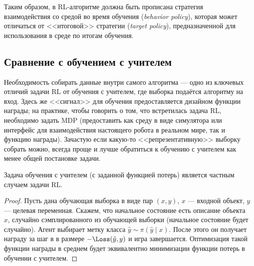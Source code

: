 Таким образом, в RL-алгоритме должна быть прописана стратегия взаимодействия со средой во время обучения (\emph{behavior policy}), которая может отличаться от <<итоговой>> стратегии (\emph{target policy}), предназначенной для использования в среде по итогам обучения. 


\subsection{Сравнение с обучением с учителем}

Необходимость собирать данные внутри самого алгоритма --- одно из ключевых отличий задачи RL от обучения с учителем, где выборка подаётся алгоритму на вход. Здесь же <<сигнал>> для обучения предоставляется дизайном функции награды; на практике, чтобы говорить о том, что встретилась задача RL, необходимо задать MDP (предоставить как среду в виде симулятора или интерфейс для взаимодействия настоящего робота в реальном мире, так и функцию награды). Зачастую если какую-то <<репрезентативную>> выборку собрать можно, всегда проще и лучше обратиться к обучению с учителем как менее общей постановке задачи.  

\begin{proposition}
Задача обучения с учителем (с заданной функцией потерь) является частным случаем задачи RL.
\begin{proof}
Пусть дана обучающая выборка в виде пар $(x, y)$, $x$ --- входной объект, $y$ --- целевая переменная. Скажем, что начальное состояние есть описание объекта $x$, случайно сэмплированного из обучающей выборки (начальное состояние будет случайно). Агент выбирает метку класса $\hat{y} \sim \pi(\hat{y} \mid x)$. После этого он получает награду за шаг в в размере $-\Loss(\hat{y}, y)$ и игра завершается. Оптимизация такой функции награды в среднем будет эквивалентно минимизации функции потерь в обучении с учителем. 
\end{proof}
\end{proposition}

